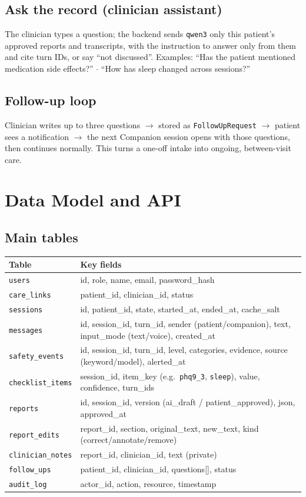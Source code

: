 \documentclass[11pt]{article}
\newcommand{\model}[1]{\texttt{\textcolor{model}{#1}}}
\begin{document}
\subsection{Ask the record (clinician assistant)}
The clinician types a question; the backend sends \model{qwen3} only this patient's approved reports and transcripts, with the instruction
to answer only from them and cite turn IDs, or say ``not discussed''. Examples:
``Has the patient mentioned medication side effects?'' $\cdot$ ``How has sleep changed across sessions?''

\subsection{Follow-up loop}
Clinician writes up to three questions $\rightarrow$ stored as \texttt{FollowUpRequest} $\rightarrow$ patient sees a notification
$\rightarrow$ the next Companion session opens with those questions, then continues normally. This turns a one-off intake into
ongoing, between-visit care.

\section{Data Model and API}
\label{sec:data}

\subsection{Main tables}
\small
\begin{tabularx}{\textwidth}{@{}l X@{}}
\toprule
\textbf{Table} & \textbf{Key fields} \\
\midrule
\texttt{users} & id, role, name, email, password\_hash \\
\texttt{care\_links} & patient\_id, clinician\_id, status \\
\texttt{sessions} & id, patient\_id, state, started\_at, ended\_at, cache\_salt \\
\texttt{messages} & id, session\_id, turn\_id, sender (patient/companion), text, input\_mode (text/voice), created\_at \\
\texttt{safety\_events} & id, session\_id, turn\_id, level, categories, evidence, source (keyword/model), alerted\_at \\
\texttt{checklist\_items} & session\_id, item\_key (e.g.\ \texttt{phq9\_3}, \texttt{sleep}), value, confidence, turn\_ids \\
\texttt{reports} & id, session\_id, version (ai\_draft / patient\_approved), json, approved\_at \\
\texttt{report\_edits} & report\_id, section, original\_text, new\_text, kind (correct/annotate/remove) \\
\texttt{clinician\_notes} & report\_id, clinician\_id, text (private) \\
\texttt{follow\_ups} & patient\_id, clinician\_id, questions[], status \\
\texttt{audit\_log} & actor\_id, action, resource, timestamp \\
\bottomrule
\end{tabularx}
\normalsize
\end{document}
